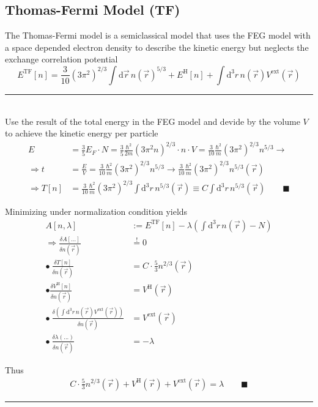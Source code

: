 \documentclass{article}
\newcommand{\diff}{\mathrm{d}}
\newcommand{\lr}[1]{\left(#1\right)}
\begin{document}
\newpage


\subsection{Thomas-Fermi Model (TF)}
The Thomas-Fermi model is a semiclassical model that uses the FEG model with a space depended electron density to describe the kinetic energy but neglects the exchange correlation potential
	\begin{equation}
		E^\text{TF}[n] = \frac{3}{10}(3\pi^2)^{2/3} \int \diff\vec{r} \, n(\vec{r})^{5/3} + E^\text{H}[n] + \int \diff^3r \, n(\vec{r}) V^\text{ext}(\vec{r})
	\end{equation}

\vspace{0.5cm}

{\color{violet}
\hrule
	\\
	Use the result of the total energy in the FEG model and devide by the volume $V$ to achieve the kinetic energy per particle
		\begin{align*}
			E &= \frac{3}{5}E_F \cdot N = \frac{3}{5} \frac{\hbar^2}{2m} (3\pi^2 n)^{2/3} \cdot n \cdot V = \frac{3}{10}\frac{\hbar^2}{m}(3\pi^2)^{2/3} n^{5/3} \longrightarrow \\
			\Rightarrow t &= \frac{E}{V} = \frac{3}{10}\frac{\hbar^2}{m}(3\pi^2)^{2/3} n^{5/3} \to \frac{3}{10}\frac{\hbar^2}{m}(3\pi^2)^{2/3} n^{5/3}(\vec{r}) \\
			\Rightarrow T[n] &= \frac{3}{10}\frac{\hbar^2}{m}(3\pi^2)^{2/3} \int \diff^3r \, n^{5/3}(\vec{r}) \equiv C \int \diff^3r \, n^{5/3}(\vec{r}) \qquad\blacksquare
		\end{align*}

	Minimizing under normalization condition yields
		\begin{align*}
			A[n,\lambda] &:= E^\text{TF}[n] - \lambda \lr{ \int \diff^3r \, n(\vec{r}) - N } \\
			\Rightarrow \frac{\delta A[...]}{\delta n(\vec{r})} &\stackrel{!}{=} 0 \\
			\bullet \ \frac{\delta T[n]}{\delta n(\vec{r})} &= C \cdot \frac{5}{3} n^{2/3}(\vec{r}) \\
			\bullet \frac{\delta V^\text{H}[n]}{\delta n(\vec{r})} &= V^\text{H}(\vec{r}) \\
			\bullet \ \frac{\delta \lr{\int \diff^3r \, n(\vec{r}) V^\text{ext}(\vec{r})}}{\delta n(\vec{r})} &= V^\text{ext}(\vec{r}) \\
			\bullet \ \frac{\delta \lambda\lr{...}}{\delta n(\vec{r})} &= -\lambda
		\end{align*}
	
	Thus
		\begin{align*}
			C \cdot \frac{5}{3} n^{2/3}(\vec{r}) + V^\text{H}(\vec{r}) + V^\text{ext}(\vec{r}) = \lambda \qquad\blacksquare
		\end{align*}

\hrule
}
\end{document}
